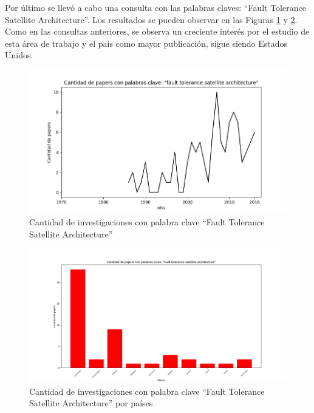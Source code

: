 Por último se llevó a cabo una consulta con las palabras claves: ``Fault Tolerance Satellite
Architecture''. Los resultados se pueden observar en las Figuras \ref{fig:ant6} y \ref{fig:ant7}.
Como en las consultas anteriores, se observa un creciente interés por el estudio de esta área de
trabajo y el país como mayor publicación, sigue siendo Estados Unidos.



\begin{figure}[h!]
 \centering
 \includegraphics[scale=0.8]{images/Secciones/antecedentes/Cantidad_paper-fault_tolerance_satellite_architecture.png}
  \caption{Cantidad de investigaciones con palabra clave ``Fault Tolerance Satellite Architecture'' }
\label{fig:ant6}
\end{figure}


\begin{figure}[h!]
 \centering
 \includegraphics[scale=0.4]{images/Secciones/antecedentes/Cantidad_paper-fault_tolerance_satellite_architecture-Country.png}
  \caption{Cantidad de investigaciones con palabra clave ``Fault Tolerance Satellite Architecture'' por países}
\label{fig:ant7}
\end{figure}

